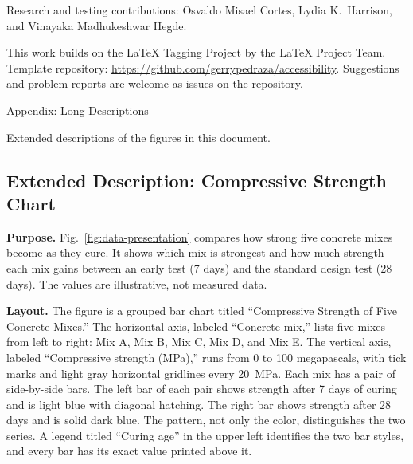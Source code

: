 \documentclass[11pt]{article}
\begin{document}
Research and testing contributions: Osvaldo Misael Cortes, Lydia K.\ Harrison, and Vinayaka Madhukeshwar Hegde.

This work builds on the LaTeX Tagging Project by the LaTeX Project Team. Template repository: \url{https://github.com/gerrypedraza/accessibility}. Suggestions and problem reports are welcome as issues on the repository.

\appendix
\clearpage
\vspace*{\fill}
\begingroup
\makeatletter
\renewcommand\section{%
  {\normalfont\Huge\bfseries\centering}}
\makeatother
\section{Appendix: Long Descriptions}
\endgroup
\begin{center}
\large Extended descriptions of the figures in this document.
\end{center}
\vspace*{\fill}
\clearpage

\subsection{Extended Description: Compressive Strength Chart}
\label{sec:data-presentation-desc}
\textbf{Purpose.} Fig.~\ref{fig:data-presentation} compares how strong five concrete mixes become as they cure. It shows which mix is strongest and how much strength each mix gains between an early test (7 days) and the standard design test (28 days). The values are illustrative, not measured data.

\textbf{Layout.} The figure is a grouped bar chart titled ``Compressive Strength of Five Concrete Mixes.'' The horizontal axis, labeled ``Concrete mix,'' lists five mixes from left to right: Mix A, Mix B, Mix C, Mix D, and Mix E. The vertical axis, labeled ``Compressive strength (MPa),'' runs from 0 to 100 megapascals, with tick marks and light gray horizontal gridlines every 20~MPa. Each mix has a pair of side-by-side bars. The left bar of each pair shows strength after 7 days of curing and is light blue with diagonal hatching. The right bar shows strength after 28 days and is solid dark blue. The pattern, not only the color, distinguishes the two series. A legend titled ``Curing age'' in the upper left identifies the two bar styles, and every bar has its exact value printed above it.
\end{document}

